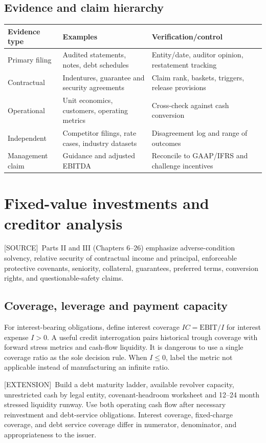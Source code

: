 \documentclass[11pt,letterpaper]{article}
\newcommand{\src}{\textsf{\color{sea}[SOURCE]}}
\newcommand{\ext}{\textsf{\color{gold}[EXTENSION]}}
\begin{document}
\subsection{Evidence and claim hierarchy}
\begin{center}\small
\begin{tabularx}{\textwidth}{p{}X X}
\toprule Evidence type & Examples & Verification/control \\
\midrule Primary filing & Audited statements, notes, debt schedules & Entity/date, auditor opinion, restatement tracking \\
Contractual & Indentures, guarantee and security agreements & Claim rank, baskets, triggers, release provisions \\
Operational & Unit economics, customers, operating metrics & Cross-check against cash conversion \\
Independent & Competitor filings, rate cases, industry datasets & Disagreement log and range of outcomes \\
Management claim & Guidance and adjusted EBITDA & Reconcile to GAAP/IFRS and challenge incentives \\
\bottomrule
\end{tabularx}
\end{center}

\section{Fixed-value investments and creditor analysis}
\src\ Parts II and III (Chapters 6--26) emphasize adverse-condition solvency, relative security of contractual income and principal, enforceable protective covenants, seniority, collateral, guarantees, preferred terms, conversion rights, and questionable-safety claims.

\subsection{Coverage, leverage and payment capacity}
For interest-bearing obligations, define interest coverage $IC=\text{EBIT}/I$ for interest expense $I>0$. A useful credit interrogation pairs historical trough coverage with forward stress metrics and cash-flow liquidity. It is dangerous to use a single coverage ratio as the sole decision rule. When $I\leq 0$, label the metric not applicable instead of manufacturing an infinite ratio.

\ext\ Build a debt maturity ladder, available revolver capacity, unrestricted cash by legal entity, covenant-headroom worksheet and 12--24 month stressed liquidity runway. Use both operating cash flow after necessary reinvestment and debt-service obligations. Interest coverage, fixed-charge coverage, and debt service coverage differ in numerator, denominator, and appropriateness to the issuer.
\end{document}
